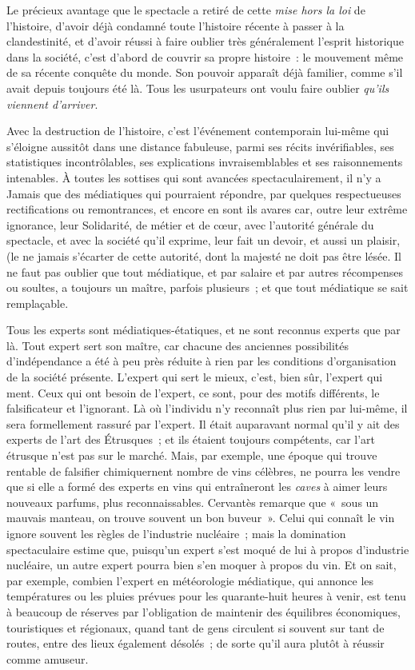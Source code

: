 \documentclass[french,twoside]{book} %
\def\bignobreak{\ifdim\lastskip<\bigskipamount
  \removelastskip\nopagebreak\bigskip\fi}
\newcommand{\labelblock}[1]{\bigbreak{\color{rubric}\noindent\textbf{#1}\par}\bignobreak}
\begin{document}
Le précieux avantage que le spectacle a retiré de cette \emph{mise hors la loi} de l’histoire, d’avoir déjà condamné toute l’histoire récente à passer à la clandestinité, et d’avoir réussi à faire oublier très généralement l’esprit historique dans la société, c’est d’abord de couvrir sa propre histoire : le mouvement même de sa récente conquête du monde. Son pouvoir apparaît déjà familier, comme s’il avait depuis toujours été là. Tous les usurpateurs ont voulu faire oublier \emph{qu’ils viennent d’arriver}.\par

\labelblock{VII}

\noindent Avec la destruction de l’histoire, c’est l’événement contemporain lui-même qui s’éloigne aussitôt dans une distance fabuleuse, parmi ses récits invérifiables, ses statistiques incontrôlables, ses explications invraisemblables et ses raisonnements intenables. À toutes les sottises qui sont avancées spectaculairement, il n’y a Jamais que des médiatiques qui pourraient répondre, par quelques respectueuses rectifications ou remontrances, et encore en sont ils avares car, outre leur extrême ignorance, leur Solidarité, de métier et de cœur, avec l’autorité générale du spectacle, et avec la société qu’il exprime, leur fait un devoir, et aussi un plaisir, (le ne jamais s’écarter de cette autorité, dont la majesté ne doit pas être lésée. Il ne faut pas oublier que tout médiatique, et par salaire et par autres récompenses ou soultes, a toujours un maître, parfois plusieurs ; et que tout médiatique se sait remplaçable.\par
Tous les experts sont médiatiques-étatiques, et ne sont reconnus experts que par là. Tout expert sert son maître, car chacune des anciennes possibilités d’indépendance a été à peu près réduite à rien par les conditions d’organisation de la société présente. L’expert qui sert le mieux, c’est, bien sûr, l’expert qui ment. Ceux qui ont besoin de l’expert, ce sont, pour des motifs différents, le falsificateur et l’ignorant. Là où l’individu n’y reconnaît plus rien par lui-même, il sera formellement rassuré par l’expert. Il était auparavant normal qu’il y ait des experts de l’art des Étrusques ; et ils étaient toujours compétents, car l’art étrusque n’est pas sur le marché. Mais, par exemple, une époque qui trouve rentable de falsifier chimiquernent nombre de vins célèbres, ne pourra les vendre que si elle a formé des experts en vins qui entraîneront les \emph{caves} à aimer leurs nouveaux parfums, plus reconnaissables. Cervantès remarque que « sous un mauvais manteau, on trouve souvent un bon buveur ». Celui qui connaît le vin ignore souvent les règles de l’industrie nucléaire ; mais la domination spectaculaire estime que, puisqu’un expert s’est moqué de lui à propos d’industrie nucléaire, un autre expert pourra bien s’en moquer à propos du vin. Et on sait, par exemple, combien l’expert en météorologie médiatique, qui annonce les températures ou les pluies prévues pour les quarante-huit heures à venir, est tenu à beaucoup de réserves par l’obligation de maintenir des équilibres économiques, touristiques et régionaux, quand tant de gens circulent si souvent sur tant de routes, entre des lieux également désolés ; de sorte qu’il aura plutôt à réussir comme amuseur.\par
\end{document}
